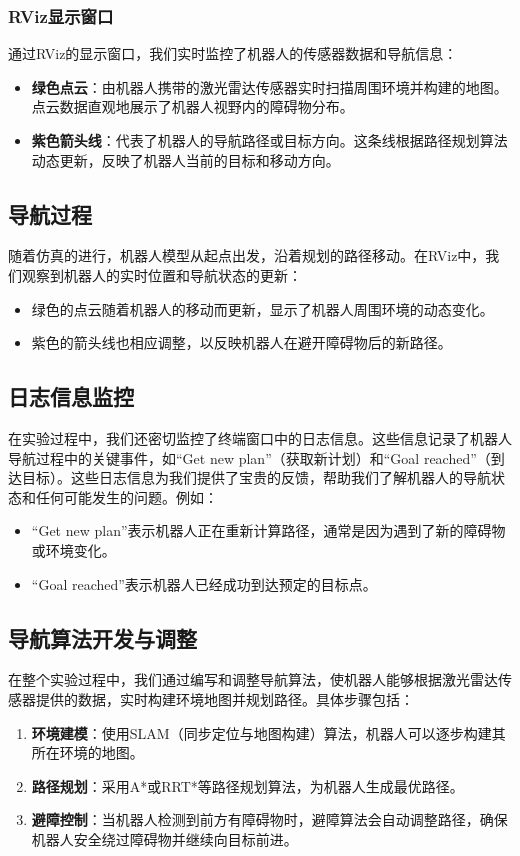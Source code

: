 \documentclass[journal,twoside,web]{ieeecolor}
\begin{document}
\subsubsection*{RViz显示窗口}
通过RViz的显示窗口，我们实时监控了机器人的传感器数据和导航信息：
\begin{itemize}
   \item \textbf{绿色点云}：由机器人携带的激光雷达传感器实时扫描周围环境并构建的地图。点云数据直观地展示了机器人视野内的障碍物分布。
   \item \textbf{紫色箭头线}：代表了机器人的导航路径或目标方向。这条线根据路径规划算法动态更新，反映了机器人当前的目标和移动方向。
\end{itemize}
 
\subsection*{导航过程}
随着仿真的进行，机器人模型从起点出发，沿着规划的路径移动。在RViz中，我们观察到机器人的实时位置和导航状态的更新：
\begin{itemize}
   \item 绿色的点云随着机器人的移动而更新，显示了机器人周围环境的动态变化。
   \item 紫色的箭头线也相应调整，以反映机器人在避开障碍物后的新路径。
\end{itemize}
 
\subsection*{日志信息监控}
在实验过程中，我们还密切监控了终端窗口中的日志信息。这些信息记录了机器人导航过程中的关键事件，如“Get new plan”（获取新计划）和“Goal reached”（到达目标）。这些日志信息为我们提供了宝贵的反馈，帮助我们了解机器人的导航状态和任何可能发生的问题。例如：
\begin{itemize}
   \item “Get new plan”表示机器人正在重新计算路径，通常是因为遇到了新的障碍物或环境变化。
   \item “Goal reached”表示机器人已经成功到达预定的目标点。
\end{itemize}
 
\subsection*{导航算法开发与调整}
在整个实验过程中，我们通过编写和调整导航算法，使机器人能够根据激光雷达传感器提供的数据，实时构建环境地图并规划路径。具体步骤包括：
\begin{enumerate}
   \item \textbf{环境建模}：使用SLAM（同步定位与地图构建）算法，机器人可以逐步构建其所在环境的地图。
   \item \textbf{路径规划}：采用A*或RRT*等路径规划算法，为机器人生成最优路径。
   \item \textbf{避障控制}：当机器人检测到前方有障碍物时，避障算法会自动调整路径，确保机器人安全绕过障碍物并继续向目标前进。
\end{enumerate}
 
\end{document}
